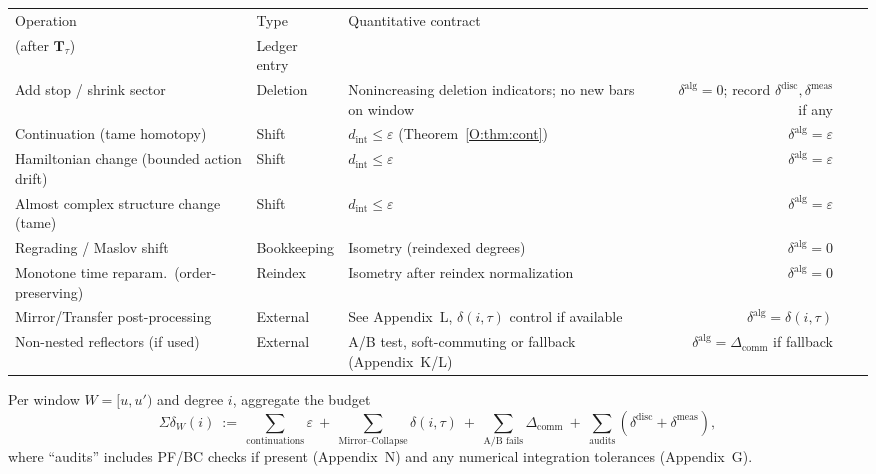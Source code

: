 \documentclass[11pt]{article}
\numberwithin{equation}{section}
\theoremstyle{definition}
\begin{document}
\begin{center}
\footnotesize
\setlength{\tabcolsep}{4pt}       %
\renewcommand{\arraystretch}{1.1} %
\begin{tabularx}{\linewidth}{@{} L{.26\linewidth} L{.14\linewidth} Xr Xr @{}}
\toprule
Operation & Type & Quantitative contract\\(after \(\mathbf{T}_\tau\)) & Ledger entry \\
\midrule
Add stop / shrink sector & Deletion & Nonincreasing deletion indicators; no new bars on window & \(\delta^{\mathrm{alg}}=0\);\; record \(\delta^{\mathrm{disc}},\delta^{\mathrm{meas}}\) if any \\
Continuation (tame homotopy) & Shift & \(d_{\mathrm{int}}\le \varepsilon\) (Theorem~\ref{O:thm:cont}) & \(\delta^{\mathrm{alg}}=\varepsilon\) \\
Hamiltonian change (bounded action drift) & Shift & \(d_{\mathrm{int}}\le \varepsilon\) & \(\delta^{\mathrm{alg}}=\varepsilon\) \\
Almost complex structure change (tame) & Shift & \(d_{\mathrm{int}}\le \varepsilon\) & \(\delta^{\mathrm{alg}}=\varepsilon\) \\
Regrading / Maslov shift & Bookkeeping & Isometry (reindexed degrees) & \(\delta^{\mathrm{alg}}=0\) \\
Monotone time reparam.\ (order-preserving) & Reindex & Isometry after reindex normalization & \(\delta^{\mathrm{alg}}=0\) \\
Mirror/Transfer post-processing & External & See Appendix~L, \(\delta(i,\tau)\) control if available & \(\delta^{\mathrm{alg}}=\delta(i,\tau)\) \\
Non-nested reflectors (if used) & External & A/B test, soft-commuting or fallback (Appendix~K/L) & \(\delta^{\mathrm{alg}}=\Delta_{\mathrm{comm}}\) if fallback \\
\bottomrule
\end{tabularx}
\end{center}


Per window \(W=[u,u')\) and degree \(i\), aggregate the budget
\[
\Sigma\delta_W(i)\ :=\ \sum_{\text{continuations}}\varepsilon\ +\ \sum_{\text{Mirror--Collapse}}\delta(i,\tau)\ +\ \sum_{\text{A/B fails}}\Delta_{\mathrm{comm}}\ +\ \sum_{\text{audits}}(\delta^{\mathrm{disc}}+\delta^{\mathrm{meas}}),
\]
where “audits” includes PF/BC checks if present (Appendix~N) and any numerical integration tolerances (Appendix~G).

\end{document}

